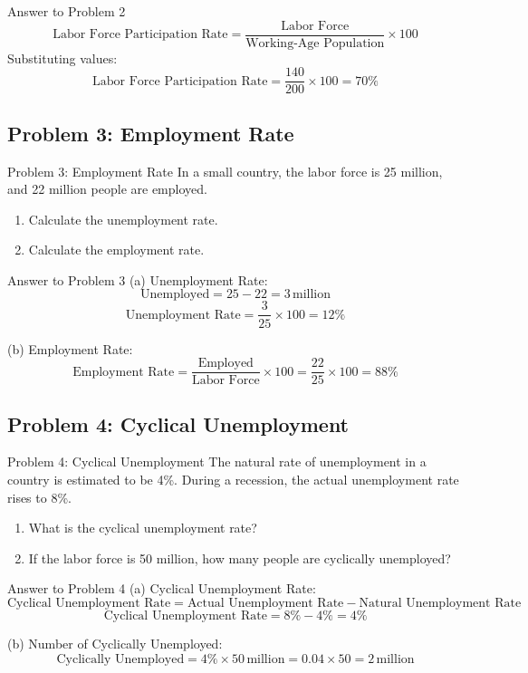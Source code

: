 \documentclass{beamer}
\begin{document}
\begin{frame}{Answer to Problem 2}
\[
\text{Labor Force Participation Rate} = \frac{\text{Labor Force}}{\text{Working-Age Population}} \times 100
\]
Substituting values:
\[
\text{Labor Force Participation Rate} = \frac{140}{200} \times 100 = 70\%
\]
\end{frame}

\subsection{Problem 3: Employment Rate}
\begin{frame}{Problem 3: Employment Rate}
In a small country, the labor force is 25 million, and 22 million people are employed.
\begin{enumerate}
    \item Calculate the unemployment rate.  
    \item Calculate the employment rate.
\end{enumerate}
\end{frame}

\begin{frame}{Answer to Problem 3}
(a) Unemployment Rate:
\[
\text{Unemployed} = 25 - 22 = 3 \, \text{million}
\]
\[
\text{Unemployment Rate} = \frac{3}{25} \times 100 = 12\%
\]

(b) Employment Rate:
\[
\text{Employment Rate} = \frac{\text{Employed}}{\text{Labor Force}} \times 100 = \frac{22}{25} \times 100 = 88\%
\]
\end{frame}

\subsection{Problem 4: Cyclical Unemployment}
\begin{frame}{Problem 4: Cyclical Unemployment}
The natural rate of unemployment in a country is estimated to be 4\%. During a recession, the actual unemployment rate rises to 8\%.
\begin{enumerate}
    \item What is the cyclical unemployment rate?  
    \item If the labor force is 50 million, how many people are cyclically unemployed?  
\end{enumerate}
\end{frame}

\begin{frame}{Answer to Problem 4}
(a) Cyclical Unemployment Rate:
\[
\text{Cyclical Unemployment Rate} = \text{Actual Unemployment Rate} - \text{Natural Unemployment Rate}
\]
\[
\text{Cyclical Unemployment Rate} = 8\% - 4\% = 4\%
\]

(b) Number of Cyclically Unemployed:
\[
\text{Cyclically Unemployed} = 4\% \times 50 \, \text{million} = 0.04 \times 50 = 2 \, \text{million}
\]
\end{frame}
\end{document}
